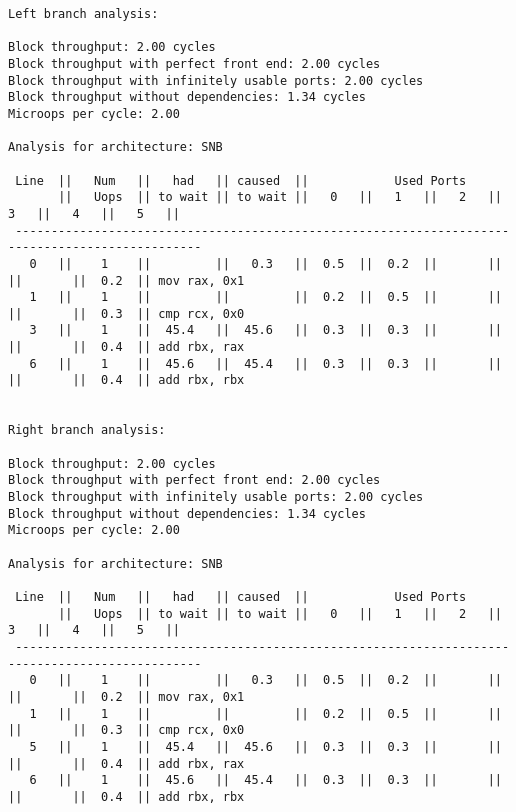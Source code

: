 \documentclass[a4paper,12pt,titlepage, twoside]{report}
\begin{document}
\begin{mdframed}[backgroundcolor=light-gray, roundcorner=10pt,leftmargin=1, rightmargin=1, innerleftmargin=15, innertopmargin=15,innerbottommargin=15, outerlinewidth=1, linecolor=light-gray]
\begin{center}
\begin{BVerbatim}[fontsize=\tiny]
Left branch analysis:

Block throughput: 2.00 cycles
Block throughput with perfect front end: 2.00 cycles
Block throughput with infinitely usable ports: 2.00 cycles
Block throughput without dependencies: 1.34 cycles
Microops per cycle: 2.00

Analysis for architecture: SNB

 Line  ||   Num   ||   had   || caused  ||            Used Ports
       ||   Uops  || to wait || to wait ||   0   ||   1   ||   2   ||   3   ||   4   ||   5   ||
 ------------------------------------------------------------------------------------------------
   0   ||    1    ||         ||   0.3   ||  0.5  ||  0.2  ||       ||       ||       ||  0.2  || mov rax, 0x1
   1   ||    1    ||         ||         ||  0.2  ||  0.5  ||       ||       ||       ||  0.3  || cmp rcx, 0x0
   3   ||    1    ||  45.4   ||  45.6   ||  0.3  ||  0.3  ||       ||       ||       ||  0.4  || add rbx, rax
   6   ||    1    ||  45.6   ||  45.4   ||  0.3  ||  0.3  ||       ||       ||       ||  0.4  || add rbx, rbx


Right branch analysis:

Block throughput: 2.00 cycles
Block throughput with perfect front end: 2.00 cycles
Block throughput with infinitely usable ports: 2.00 cycles
Block throughput without dependencies: 1.34 cycles
Microops per cycle: 2.00

Analysis for architecture: SNB

 Line  ||   Num   ||   had   || caused  ||            Used Ports
       ||   Uops  || to wait || to wait ||   0   ||   1   ||   2   ||   3   ||   4   ||   5   ||
 ------------------------------------------------------------------------------------------------
   0   ||    1    ||         ||   0.3   ||  0.5  ||  0.2  ||       ||       ||       ||  0.2  || mov rax, 0x1
   1   ||    1    ||         ||         ||  0.2  ||  0.5  ||       ||       ||       ||  0.3  || cmp rcx, 0x0
   5   ||    1    ||  45.4   ||  45.6   ||  0.3  ||  0.3  ||       ||       ||       ||  0.4  || add rbx, rax
   6   ||    1    ||  45.6   ||  45.4   ||  0.3  ||  0.3  ||       ||       ||       ||  0.4  || add rbx, rbx
\end{BVerbatim}
\end{center}
\end{mdframed}
\end{document}

